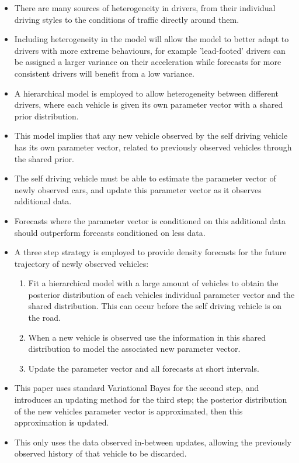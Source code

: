 \documentclass[12pt,a4paper]{article}\usepackage[]{graphicx}\usepackage[]{color}
\begin{document}
\begin{itemize}
\item There are many sources of heterogeneity in drivers, from their individual driving styles to the conditions of traffic directly around them.
\item Including heterogeneity in the model will allow the model to better adapt to drivers with more extreme behaviours, for example 'lead-footed' drivers can be assigned a larger variance on their acceleration while forecasts for more consistent drivers will benefit from a low variance.
\item A hierarchical model is employed to allow heterogeneity between different drivers, where each vehicle is given its own parameter vector with a shared prior distribution.
\item This model implies that any new vehicle observed by the self driving vehicle has its own parameter vector, related to previously observed vehicles through the shared prior.
\item The self driving vehicle must be able to estimate the parameter vector of newly observed cars, and update this parameter vector as it observes additional data.
\item Forecasts where the parameter vector is conditioned on this additional data should outperform forecasts conditioned on less data.
\item A three step strategy is employed to provide density forecasts for the future trajectory of newly observed vehicles:
\begin{enumerate}
\item Fit a hierarchical model with a large amount of vehicles to obtain the posterior distribution of each vehicles individual parameter vector and the shared distribution. This can occur before the self driving vehicle is on the road.
\item When a new vehicle is observed use the information in this shared distribution to model the associated new parameter vector. 
\item Update the parameter vector and all forecasts at short intervals.
\end{enumerate}
\item This paper uses standard Variational Bayes for the second step, and introduces an updating method for the third step; the posterior distribution of the new vehicles parameter vector is approximated, then this approximation is updated.
\item This only uses the data observed in-between updates, allowing the previously observed history of that vehicle to be discarded.

\end{itemize}
\end{document}
